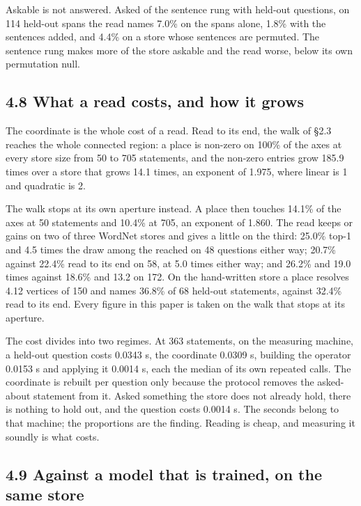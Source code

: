 \documentclass[10pt,letterpaper,twocolumn]{article}
\begin{document}
Askable is not answered. Asked of the sentence rung with held-out questions, on 114 held-out spans the
read names 7.0\% on the spans alone, 1.8\% with the sentences added, and 4.4\% on a store whose
sentences are permuted. The sentence rung makes more of the store askable and the read worse, below
its own permutation null.

\subsection{4.8 What a read costs, and how it grows}\label{48-what-a-read-costs-and-how-it-grows}

The coordinate is the whole cost of a read. Read to its end, the walk of §2.3 reaches the whole
connected region: a place is non-zero on 100\% of the axes at every store size from 50 to 705
statements, and the non-zero entries grow 185.9 times over a store that grows 14.1 times, an exponent
of 1.975, where linear is 1 and quadratic is 2.

The walk stops at its own aperture instead. A place then touches 14.1\% of the axes at 50 statements
and 10.4\% at 705, an exponent of 1.860. The read keeps or gains on two of three WordNet stores and
gives a little on the third: 25.0\% top-1 and 4.5 times the draw among the reached on 48 questions
either way; 20.7\% against 22.4\% read to its end on 58, at 5.0 times either way; and 26.2\% and 19.0
times against 18.6\% and 13.2 on 172. On the hand-written store a place resolves 4.12 vertices of 150
and names 36.8\% of 68 held-out statements, against 32.4\% read to its end. Every figure in this paper
is taken on the walk that stops at its aperture.

The cost divides into two regimes. At 363 statements, on the measuring machine, a held-out question
costs 0.0343 s, the coordinate 0.0309 s, building the operator 0.0153 s and applying it 0.0014 s,
each the median of its own repeated calls. The coordinate is rebuilt per question only because the
protocol removes the asked-about statement from it. Asked something the store does not already hold,
there is nothing to hold out, and the question costs 0.0014 s. The seconds belong to that machine; the
proportions are the finding. Reading is cheap, and measuring it soundly is what costs.

\subsection{4.9 Against a model that is trained, on the same store}\label{49-against-a-model-that-is-trained-on-the-same-store}
\end{document}
